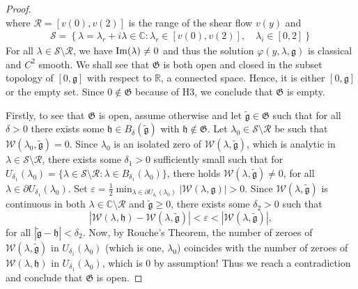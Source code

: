 \documentclass[11pt,reqno]{amsproc}
\theoremstyle{definition}
\numberwithin{equation}{section}
\newcommand{\C}{{\mathbb C}}
\newcommand{\R}{{\mathbb R}}
\newcommand{\W}{{\mathcal{W}}}
\newcommand{\g}{{\mathfrak{g}}}
\newcommand{\p}{\partial}
\def\Im{{\rm Im}}
\begin{document}
\begin{proof}
\begin{equation}
\end{equation}
where $\mathcal{R} = [v(0),v(2)]$ is the range of the shear flow $v(y)$ and 
\begin{align*}
\mathcal{S}=\left \lbrace \lambda=\lambda_r + i\lambda \in \C: \lambda_r \in [v(0), v(2)], \quad \lambda_i\in [0,2] \right\rbrace 
\end{align*} 
For all $\lambda\in \mathcal{S}\setminus\mathcal{R}$, we have $\Im(\lambda) \neq 0$ and thus the solution $\varphi(y,\lambda,\g)$ is classical and $C^2$ smooth. We shall see that $\mathfrak{G}$ is both open and closed in the subset topology of $[0,\g]$ with respect to $\R$, a connected space. Hence, it is either $[0, \g]$ or the empty set. Since $0\not \in \mathfrak{G}$ because of H3, we conclude that $\mathfrak{G}$ is empty.

Firstly, to see that $\mathfrak{G}$ is open, assume otherwise and let $\tilde{\g}\in \mathfrak{G}$ such that for all $\delta>0$ there exists some $\mathfrak{h}\in B_\delta(\tilde{\g})$ with $\mathfrak{h}\not\in \mathfrak{G}$. Let $\lambda_0\in \mathcal{S}\setminus \mathcal{R}$ be such that $\mathcal{W}(\lambda_0,\tilde\g) = 0$. Since $\lambda_0$ is an isolated zero of  $\W(\lambda,\tilde\g)$, which is analytic in $\lambda\in \mathcal{S}\setminus\mathcal{R}$,  there exists some $\delta_1>0$ sufficiently small such that for $U_{\delta_1}(\lambda_0)=\lbrace \lambda\in \mathcal{S}\setminus\mathcal{R}: \lambda\in B_{\delta_1}(\lambda_0) \rbrace$, there holds $\mathcal{W}(\lambda,\tilde\g)\neq 0$, for all $\lambda\in \p U_{\delta_1}(\lambda_0)$. Set $\varepsilon=\frac12 \min_{\lambda\in\p U_{\delta_1}(\lambda_0)}|\mathcal{W}(\lambda,\g)|>0$. Since $\mathcal{W}(\lambda,\tilde\g)$ is continuous in both $\lambda\in \C\setminus\mathcal{R}$ and $\tilde\g\geq 0$, there exists some $\delta_2>0$ such that 
\begin{equation}
|\mathcal{W}(\lambda,\mathfrak{h}) - \mathcal{W}(\lambda,\tilde{\g})| < \varepsilon < |\mathcal{W}(\lambda,\tilde\g)|,
\end{equation}
for all $|\tilde{\g} - \mathfrak{h}| < \delta_2$. Now, by Rouche's Theorem, the number of zeroes of $\mathcal{W}(\lambda,\tilde\g)$ in $U_{\delta_1}(\lambda_0)$ (which is one, $\lambda_0$) coincides with the number of zeroes of $\mathcal{W}(\lambda,\mathfrak{h})$ in $U_{\delta_1}(\lambda_0)$, which is 0 by assumption! Thus we reach a contradiction and conclude that $\mathfrak{G}$ is open.


\end{proof}
\end{document}
